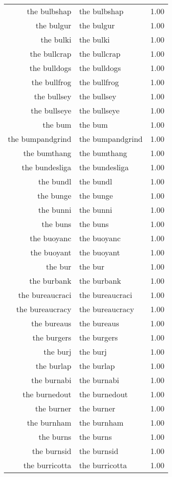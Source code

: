 \begin{table}[ht]
\begin{tabular}{rlr}
  the bulbshap & the bulbshap & 1.00 \\ 
  the bulgur & the bulgur & 1.00 \\ 
  the bulki & the bulki & 1.00 \\ 
  the bullcrap & the bullcrap & 1.00 \\ 
  the bulldogs & the bulldogs & 1.00 \\ 
  the bullfrog & the bullfrog & 1.00 \\ 
  the bullsey & the bullsey & 1.00 \\ 
  the bullseye & the bullseye & 1.00 \\ 
  the bum & the bum & 1.00 \\ 
  the bumpandgrind & the bumpandgrind & 1.00 \\ 
  the bumthang & the bumthang & 1.00 \\ 
  the bundesliga & the bundesliga & 1.00 \\ 
  the bundl & the bundl & 1.00 \\ 
  the bunge & the bunge & 1.00 \\ 
  the bunni & the bunni & 1.00 \\ 
  the buns & the buns & 1.00 \\ 
  the buoyanc & the buoyanc & 1.00 \\ 
  the buoyant & the buoyant & 1.00 \\ 
  the bur & the bur & 1.00 \\ 
  the burbank & the burbank & 1.00 \\ 
  the bureaucraci & the bureaucraci & 1.00 \\ 
  the bureaucracy & the bureaucracy & 1.00 \\ 
  the bureaus & the bureaus & 1.00 \\ 
  the burgers & the burgers & 1.00 \\ 
  the burj & the burj & 1.00 \\ 
  the burlap & the burlap & 1.00 \\ 
  the burnabi & the burnabi & 1.00 \\ 
  the burnedout & the burnedout & 1.00 \\ 
  the burner & the burner & 1.00 \\ 
  the burnham & the burnham & 1.00 \\ 
  the burns & the burns & 1.00 \\ 
  the burnsid & the burnsid & 1.00 \\ 
  the burricotta & the burricotta & 1.00 \\ 

\end{tabular}
\end{table}
